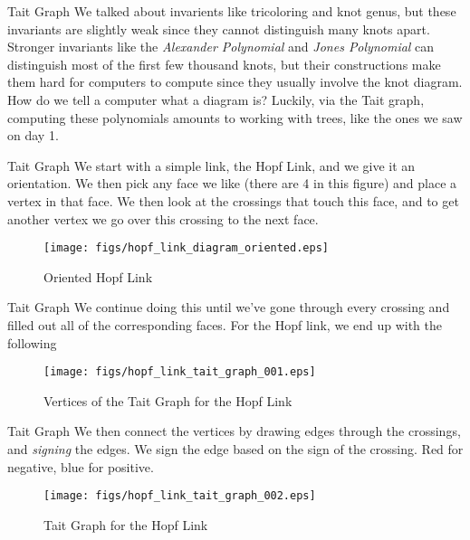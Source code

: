 \documentclass{beamer}
\begin{document}
    \begin{frame}{Tait Graph}
        We talked about invarients like tricoloring and knot genus, but these
        invariants are slightly weak since they cannot distinguish many knots apart.
        Stronger invariants like the \textit{Alexander Polynomial} and
        \textit{Jones Polynomial} can distinguish most of the first few thousand knots,
        but their constructions make them hard for computers to compute since they usually
        involve the knot diagram. How do we tell a computer what a diagram is? Luckily, via the Tait graph,
        computing these polynomials amounts to working with trees, like the ones we saw on
        day 1. 
    \end{frame}
    \begin{frame}{Tait Graph}
        We start with a simple link, the Hopf Link, and we give it an
        orientation. We then pick any face we like (there are 4 in this figure) and place
        a vertex in that face. We then look at the crossings that touch this face, and to
        get another vertex we go over this crossing to the next face.
        \begin{figure}
            \centering
            \texttt{[image: figs/hopf\_link\_diagram\_oriented.eps]}
            \caption{Oriented Hopf Link}
            \label{fig:hopf_link_diagram_oriented}
        \end{figure}
    \end{frame}
    \begin{frame}{Tait Graph}
        We continue doing this until we've gone through every crossing and filled out all of
        the corresponding faces. For the Hopf link, we end up with the following
        \begin{figure}
            \centering
            \texttt{[image: figs/hopf\_link\_tait\_graph\_001.eps]}
            \caption{Vertices of the Tait Graph for the Hopf Link}
            \label{fig:hopf_link_tait_graph_001}
        \end{figure}
    \end{frame}
    \begin{frame}{Tait Graph}
        We then connect the vertices by drawing edges through the crossings, and
        \textit{signing} the edges. We sign the edge based on the sign of the crossing.
        Red for negative, blue for positive.
        \begin{figure}
            \centering
            \texttt{[image: figs/hopf\_link\_tait\_graph\_002.eps]}
            \caption{Tait Graph for the Hopf Link}
            \label{fig:hopf_link_tait_graph_002}
        \end{figure}
    \end{frame}
\end{document}

